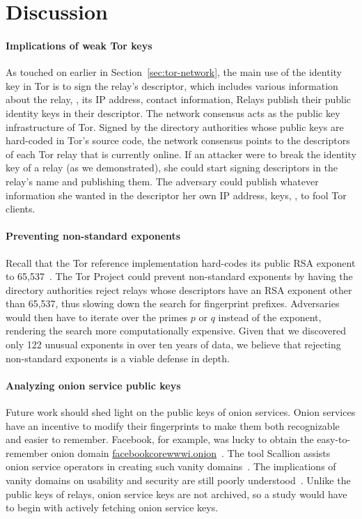 \section{Discussion}
\label{sec:discussion}
\paragraph{Implications of weak Tor keys}
As touched on earlier in Section~\ref{sec:tor-network}, the main use of the
identity key in Tor is to sign the relay's descriptor, which includes various
information about the relay, \eg, its IP address, contact information, \etc
Relays publish their public identity keys in their descriptor.  The network
consensus acts as the public key infrastructure of Tor.  Signed by the directory
authorities whose public keys are hard-coded in Tor's source code, the network
consensus points to the descriptors of each Tor relay that is currently online.
If an attacker were to break the identity key of a relay (as we demonstrated),
she could start signing descriptors in the relay's name and publishing them. The
adversary could publish whatever information she wanted in the descriptor \eg
her own IP address, keys, \etc, to fool Tor clients.

\paragraph{Preventing non-standard exponents}
Recall that the Tor reference implementation hard-codes its public RSA exponent
to 65,537~\cite[\S~0.3]{torspec}.  The Tor Project could prevent non-standard
exponents by having the directory authorities reject relays whose descriptors
have an RSA exponent other than 65,537, thus slowing down the search for
fingerprint prefixes.  Adversaries would then have to iterate over the primes
$p$ or $q$ instead of the exponent, rendering the search more computationally
expensive.  Given that we discovered only 122 unusual exponents in over ten
years of data, we believe that rejecting non-standard exponents is a viable
defense in depth.

\paragraph{Analyzing onion service public keys}
Future work should shed light on the public keys of onion services.  Onion
services have an incentive to modify their fingerprints to make them both
recognizable and easier to remember.  Facebook, for example, was lucky to
obtain the easy-to-remember onion domain
\url{facebookcorewwwi.onion}~\cite{facebook}.  The tool Scallion assists onion
service operators in creating such vanity domains~\cite{scallion}.  The
implications of vanity domains on usability and security are still poorly
understood~\cite{vanity-domains}.  Unlike the public keys of relays, onion
service keys are not archived, so a study would have to begin with actively
fetching onion service keys.

